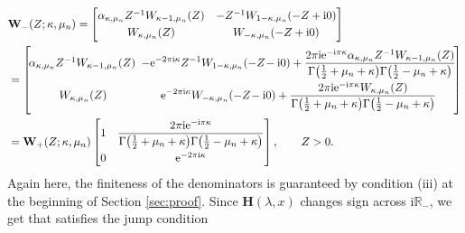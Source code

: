 \documentclass[pdftex]{sigma}
\numberwithin{equation}{section}
\newcommand{\ee}{\mathrm{e}}
\newcommand{\ii}{\mathrm{i}}
\newcommand{\para}[1]{\breve{#1}}
\begin{document}
\begin{align*} %
 &\mathbf{W}_{-}(Z;\kappa,\mu_n) =
 \begin{bmatrix}
 \alpha_{\kappa,\mu_n}Z^{-1}W_{\kappa-1,\mu_n}(Z) & -Z^{-1}W_{1-\kappa,\mu_n}(-Z+\ii 0)\vspace{1mm}\\
 W_{\kappa,\mu_n}(Z) & W_{-\kappa,\mu_n}(-Z+\ii 0)
 \end{bmatrix}\\
 & =\begin{bmatrix}
 \! \alpha_{\kappa,\mu_n}Z^{-1}W_{\kappa-1,\mu_n}(Z) \!&\displaystyle\!\! -\ee^{-2\pi \ii\kappa}Z^{-1} W_{1-\kappa,\mu_n}(-Z\!-\ii 0)+\frac{2\pi \ii\ee^{-\ii\pi\kappa}\alpha_{\kappa,\mu_n}Z^{-1}W_{\kappa-1,\mu_n}(Z)}{\Gamma\big(\frac{1}{2} +\mu_n+\kappa\big)\Gamma\big(\frac{1}{2} -\mu_n+\kappa\big)} \! \vspace{1mm}\\
 W_{\kappa,\mu_n}(Z)\!& \!\displaystyle \ee^{-2\pi \ii\kappa}W_{-\kappa,\mu_n}(-Z\!-\ii 0) +
 \frac{2\pi \ii \ee^{-\ii\pi\kappa}W_{\kappa,\mu_n}(Z)}{\Gamma\big(\frac{1}{2} +\mu_n+\kappa\big)\Gamma\big(\frac{1}{2} -\mu_n+\kappa\big)}
 \end{bmatrix} \\
 & =\mathbf{W}_{+}(Z;\kappa,\mu_n)\begin{bmatrix}
 1 & \displaystyle \frac{2\pi \ii\ee^{-\ii\pi\kappa}}{\Gamma\big(\frac{1}{2}+\mu_n+\kappa\big)\Gamma\big(\frac{1}{2}-\mu_n+\kappa\big)} \vspace{1mm} \\
 0 & \ee^{-2\pi \ii\kappa}
 \end{bmatrix},\qquad Z>0.
\end{align*}
Again here, the finiteness of the denominators is guaranteed by condition (iii) at the beginning of Section \ref{sec:proof}. Since $\mathbf{H}(\lambda,x)$ changes sign across $\ii\mathbb{R}_-$, we get that \smash{$\para{\mathbf{\Phi}}^{(\infty)}(\lambda)=\para{\mathbf{\Phi}}^{(\infty)}_n(\lambda,x)$} satisfies the jump condition
\end{document}
